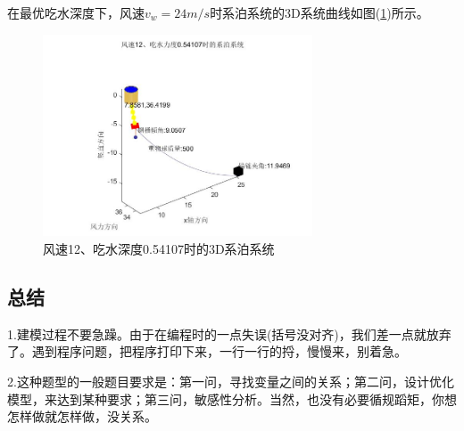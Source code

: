            在最优吃水深度下，风速$v_w=24m/s$时系泊系统的3D系统曲线如图(\ref{风速12、吃水深度0.54107时的3D系泊系统})所示。
            \begin{figure}[H]
                \centering
                \includegraphics[width=8cm]{images/3D_v_wind_12_h_xitong.jpg}
                \caption{风速12、吃水深度0.54107时的3D系泊系统}
                \label{风速12、吃水深度0.54107时的3D系泊系统}
            \end{figure}

    \subsection{总结}
        \par
        1.建模过程不要急躁。由于在编程时的一点失误(括号没对齐)，我们差一点就放弃了。遇到程序问题，把程序打印下来，一行一行的捋，慢慢来，别着急。
        \par
        2.这种题型的一般题目要求是：第一问，寻找变量之间的关系；第二问，设计优化模型，来达到某种要求；第三问，敏感性分析。当然，也没有必要循规蹈矩，你想怎样做就怎样做，没关系。

% 
